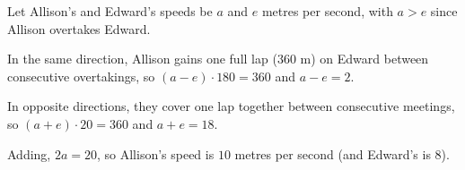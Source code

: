 Let Allison's and Edward's speeds be $a$ and $e$ metres per second, with $a>e$ since Allison overtakes Edward.

In the same direction, Allison gains one full lap ($360$ m) on Edward between consecutive overtakings, so $(a-e)\cdot180=360$ and $a-e=2$.

In opposite directions, they cover one lap together between consecutive meetings, so $(a+e)\cdot20=360$ and $a+e=18$.

Adding, $2a=20$, so Allison's speed is $\boxed{10}$ metres per second (and Edward's is $8$).
